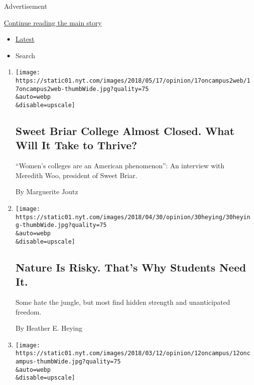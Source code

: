 Advertisement

\protect\hyperlink{after-mid1}{Continue reading the main story}

\begin{itemize}
\tightlist
\item
  \protect\hyperlink{stream-panel}{Latest}
\item
  Search
\end{itemize}

\begin{enumerate}
\def\labelenumi{\arabic{enumi}.}
\item
  \href{/2018/05/17/opinion/sweet-briar-meredith-woo-interview.html}{}

  \texttt{[image: https://static01.nyt.com/images/2018/05/17/opinion/17oncampus2web/17oncampus2web-thumbWide.jpg?quality=75\\\&auto=webp\\\&disable=upscale]}

  \hypertarget{sweet-briar-college-almost-closed-what-will-it-take-to-thrive}{%
  \subsection{Sweet Briar College Almost Closed. What Will It Take to
  Thrive?}\label{sweet-briar-college-almost-closed-what-will-it-take-to-thrive}}

  ``Women's colleges are an American phenomenon'': An interview with
  Meredith Woo, president of Sweet Briar.

  By Marguerite Joutz
\item
  \href{/2018/04/30/opinion/nature-students-risk.html}{}

  \texttt{[image: https://static01.nyt.com/images/2018/04/30/opinion/30heying/30heying-thumbWide.jpg?quality=75\\\&auto=webp\\\&disable=upscale]}

  \hypertarget{nature-is-risky-thats-why-students-need-it}{%
  \subsection{Nature Is Risky. That's Why Students Need
  It.}\label{nature-is-risky-thats-why-students-need-it}}

  Some hate the jungle, but most find hidden strength and unanticipated
  freedom.

  By Heather E. Heying
\item
  \href{/2018/03/12/opinion/back-to-school-at-64.html}{}

  \texttt{[image: https://static01.nyt.com/images/2018/03/12/opinion/12oncampus/12oncampus-thumbWide.jpg?quality=75\\\&auto=webp\\\&disable=upscale]}


\end{enumerate}

